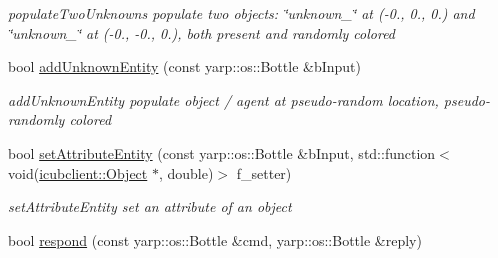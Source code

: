 \begin{DoxyCompactItemize}
\begin{DoxyCompactList}\small\item\em populate\+Two\+Unknowns populate two objects\+: \char`\"{}unknown\+\_\char`\"{} at (-\/0., 0., 0.) and \char`\"{}unknown\+\_\char`\"{} at (-\/0., -\/0., 0.), both present and randomly colored \end{DoxyCompactList}\item 
bool \hyperlink{group__opcPopulator_a85dcb08eeb5dd99770190dc06abfcef1}{add\+Unknown\+Entity} (const yarp\+::os\+::\+Bottle \&b\+Input)
\begin{DoxyCompactList}\small\item\em add\+Unknown\+Entity populate object / agent at pseudo-\/random location, pseudo-\/randomly colored \end{DoxyCompactList}\item 
bool \hyperlink{group__opcPopulator_a2af2bb944aa9801c0ad8634cdffee498}{set\+Attribute\+Entity} (const yarp\+::os\+::\+Bottle \&b\+Input, std\+::function$<$ void(\hyperlink{group__icubclient__representations_classicubclient_1_1Object}{icubclient\+::\+Object} $\ast$, double)$>$ f\+\_\+setter)
\begin{DoxyCompactList}\small\item\em set\+Attribute\+Entity set an attribute of an object \end{DoxyCompactList}\item 
bool \hyperlink{group__opcPopulator_ab8b7466e7e126e6604711824986ec0ac}{respond} (const yarp\+::os\+::\+Bottle \&cmd, yarp\+::os\+::\+Bottle \&reply)
\end{DoxyCompactItemize}
